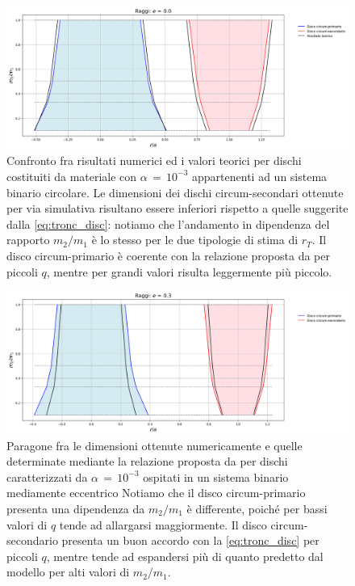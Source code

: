 \begin{figure}[H]
  \centering
  \includegraphics[width=\textwidth]{Immagini/Confronto/conrag_A3_e0.png}
  \caption{Confronto fra risultati numerici ed i valori teorici per dischi costituiti da materiale con $\alpha\,=\,10^{-3}$ appartenenti ad un sistema binario circolare. Le dimensioni dei dischi circum-secondari ottenute per via simulativa risultano essere inferiori rispetto a quelle suggerite dalla \eqref{eq:tronc_disc}: notiamo che l'andamento in dipendenza del rapporto $m_2/m_1$ è lo stesso per le due tipologie di stima di $r_T$. Il disco circum-primario è coerente con la relazione proposta da \textcite{ManaraTronc2019} per piccoli $q$, mentre per grandi valori risulta leggermente più piccolo.}
  \label{fig:conf_rag30}
\end{figure}

\begin{figure}[H]
  \centering
  \includegraphics[width=\textwidth]{Immagini/Confronto/conrag_A3_e3.png}
  \caption{Paragone fra le dimensioni ottenute numericamente e quelle determinate mediante la relazione proposta da \textcite{ManaraTronc2019} per dischi caratterizzati da  $\alpha\,=\,10^{-3}$ ospitati in un sistema binario mediamente eccentrico Notiamo che il disco circum-primario presenta una dipendenza da $m_2/m_1$ è differente, poiché per bassi valori di $q$ tende ad allargarsi maggiormente. Il disco circum-secondario presenta un buon accordo con la \eqref{eq:tronc_disc} per piccoli $q$, mentre tende ad espandersi più di quanto predetto dal modello per alti valori di $m_2/m_1$.}
  \label{fig:conf_rag33}
\end{figure}

